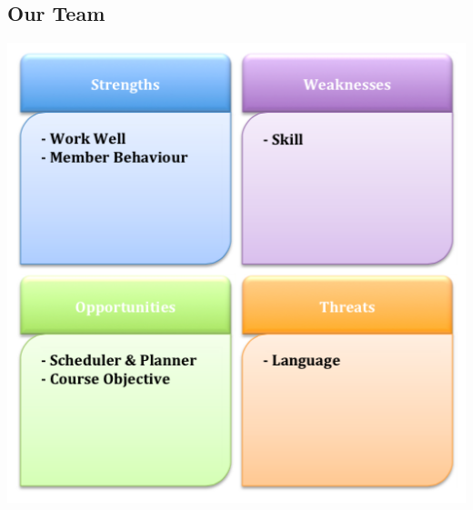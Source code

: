 \documentclass[11pt]{article}
\begin{document}
\subsection{Our Team}
\begin{center}			
	\includegraphics[scale = 0.4]{Figure02}
\end{center}
\end{document}
